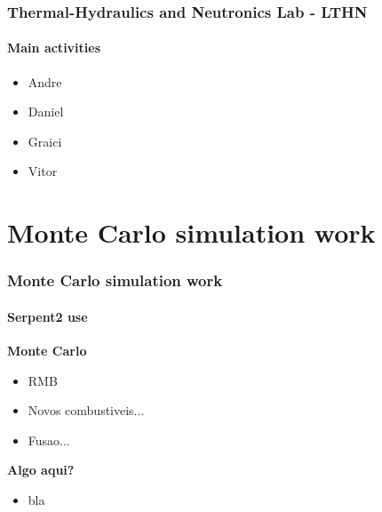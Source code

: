 \documentclass[svgnames,smaller,table]{beamer}
\begin{document}
\begin{frame}
  \frametitle{Thermal-Hydraulics and Neutronics Lab - LTHN}
  \framesubtitle{Main activities}
  \begin{center}
    \begin{itemize}
    \item Andre
    \item Daniel
    \item Graici
    \item Vitor
    \end{itemize}
  \end{center}
\end{frame}

\section{Monte Carlo simulation work}
\begin{frame}
  \frametitle{Monte Carlo simulation work}
  \framesubtitle{Serpent2 use}
  \textbf{Monte Carlo}
    \begin{itemize}
    \item RMB
    \item Novos combustiveis...
    \item Fusao...
    \end{itemize}
    \vspace{10px}
  \textbf{Algo aqui?}
    \begin{itemize}
    \item bla
    \end{itemize}
\end{frame}
\end{document}
